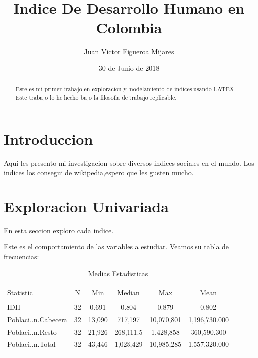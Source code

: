 \documentclass{article}
\title{Indice De Desarrollo Humano en Colombia}
\author[]{\normalsize Juan Victor Figueroa Mijares}
\affil[,]{\small  Facultad de Ingenieria,\\ 

Universidad de los Andes\\
\texttt{{jv.figueroa10}@uniandes.edu.co}}
\date{30 de Junio de 2018}
\begin{document}


\maketitle

\begin{abstract}


Este es mi primer trabajo en exploracion y modelamiento de indices usando LATEX. Este trabajo lo he hecho bajo la filosofia de trabajo replicable.

\end{abstract}


\section*{Introduccion}


Aqui les presento mi investigacion sobre diversos indices sociales en el mundo. Los indices los consegui de wikipedia,espero que les gusten mucho. 

\clearpage

\section{Exploracion Univariada}\label{univariada}

  En esta seccion exploro cada indice.

  Este es el comportamiento de las variables a estudiar.    Veamos su tabla de frecuencias:




\begin{table}[!htbp] \centering 
  \caption{Medias Estadisticas} 
  \label{Status} 
\begin{tabular}{@{\extracolsep{5pt}}lccccc} 
\\[-1.8ex]\hline 
\hline \\[-1.8ex] 
Statistic & \multicolumn{1}{c}{N} & \multicolumn{1}{c}{Min} & \multicolumn{1}{c}{Median} & \multicolumn{1}{c}{Max} & \multicolumn{1}{c}{Mean} \\ 
\hline \\[-1.8ex] 
IDH & 32 & 0.691 & 0.804 & 0.879 & 0.802 \\ 
Poblaci..n.Cabecera & 32 & 13,090 & 717,197 & 10,070,801 & 1,196,730.000 \\ 
Poblaci..n.Resto & 32 & 21,926 & 268,111.5 & 1,428,858 & 360,590.300 \\ 
Poblaci..n.Total & 32 & 43,446 & 1,028,429 & 10,985,285 & 1,557,320.000 \\ 
\hline \\[-1.8ex] 
\end{tabular} 
\end{table} 
\end{document}
